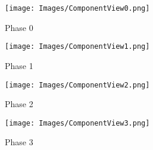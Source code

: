 \begin{figure}[H]
	\texttt{[image: Images/ComponentView0.png]}
	\caption{\label{fig:ComponentView0}Phase 0}
\end{figure}
\begin{figure}[H]
	\texttt{[image: Images/ComponentView1.png]}
	\caption{\label{fig:ComponentView1}Phase 1}
\end{figure}
\begin{figure}[H]
	\texttt{[image: Images/ComponentView2.png]}
	\caption{\label{fig:ComponentView2}Phase 2}
\end{figure}
\begin{figure}[H]
	\texttt{[image: Images/ComponentView3.png]}
	\caption{\label{fig:ComponentView3}Phase 3}
\end{figure}